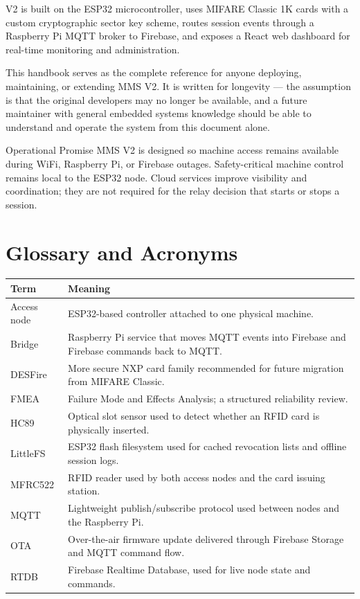\documentclass[12pt,a4paper,twoside]{report}
\begin{document}
V2 is built on the ESP32 microcontroller, uses MIFARE Classic 1K cards with a custom cryptographic sector key scheme, routes session events through a Raspberry Pi MQTT broker to Firebase, and exposes a React web dashboard for real-time monitoring and administration.

This handbook serves as the complete reference for anyone deploying, maintaining, or extending MMS V2. It is written for longevity --- the assumption is that the original developers may no longer be available, and a future maintainer with general embedded systems knowledge should be able to understand and operate the system from this document alone.

\begin{controlbox}{Operational Promise}
MMS V2 is designed so machine access remains available during WiFi, Raspberry Pi, or Firebase outages. Safety-critical machine control remains local to the ESP32 node. Cloud services improve visibility and coordination; they are not required for the relay decision that starts or stops a session.
\end{controlbox}

\chapter*{Glossary and Acronyms}
\begin{longtable}{L{3cm}L{11cm}}
\toprule
\textbf{Term} & \textbf{Meaning} \\
\midrule
Access node & ESP32-based controller attached to one physical machine. \\
Bridge & Raspberry Pi service that moves MQTT events into Firebase and Firebase commands back to MQTT. \\
DESFire & More secure NXP card family recommended for future migration from MIFARE Classic. \\
FMEA & Failure Mode and Effects Analysis; a structured reliability review. \\
HC89 & Optical slot sensor used to detect whether an RFID card is physically inserted. \\
LittleFS & ESP32 flash filesystem used for cached revocation lists and offline session logs. \\
MFRC522 & RFID reader used by both access nodes and the card issuing station. \\
MQTT & Lightweight publish/subscribe protocol used between nodes and the Raspberry Pi. \\
OTA & Over-the-air firmware update delivered through Firebase Storage and MQTT command flow. \\
RTDB & Firebase Realtime Database, used for live node state and commands. \\
\bottomrule
\end{longtable}
\end{document}
